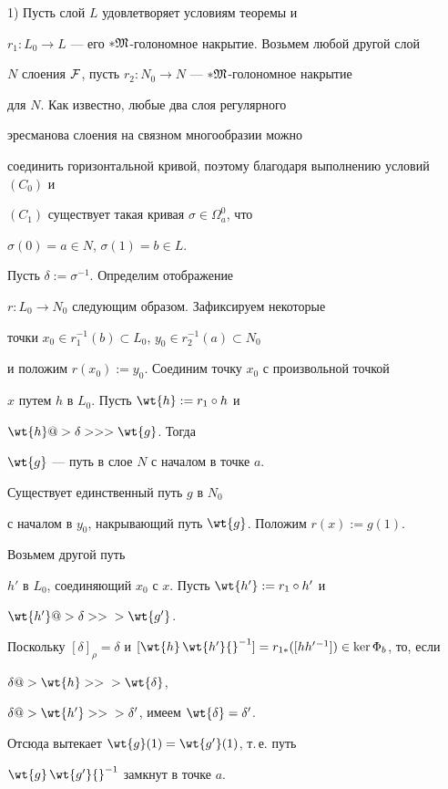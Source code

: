 \begin{pf}


1) Пусть слой $L$ удовлетворяет условиям теоремы и


$r_1: L_0\to L$ --- его $*\frak M$-голономное накрытие. Возьмем любой другой слой


$N$ слоения $\cal F$, пусть $r_2: N_0\to N$ --- $*\frak M$-голономное накрытие


для $N$. Как известно, любые два слоя регулярного


эресманова слоения на связном многообразии можно


соединить горизонтальной кривой, поэтому благодаря выполнению условий $(C_0)$ и


$(C_1)$ существует такая кривая $\sigma\in\Omega^0_a$, что


$\sigma(0)=a\in N$, $\sigma(1)=b\in L$.


Пусть $\delta:=\sigma^{-1}$. Определим отображение


$r: L_0\to N_0$ следующим образом. Зафиксируем некоторые


точки $x_0\in r_1^{-1}(b)\subset L_0$, $y_0\in r_2^{-1}(a)\subset N_0$


и положим $r(x_0):=y_0$. Соединим точку $x_0$ с произвольной точкой


$x$ путем $h$ в $L_0$. Пусть $\wt{h}:=r_1\circ h$ и


$\wt{h}@> {\delta}>> >\wt{g}$. Тогда


$\wt{g}$ --- путь в слое $N$ с началом в точке $a$.


Существует единственный путь $g$ в $N_0$


с началом в $y_0$, накрывающий путь $\wt{g}$. Положим $r(x):=g(1)$.


Возьмем другой путь


$h'$ в $L_0$, соединяющий $x_0$ с $x$. Пусть $\wt{h'}:=r_1\circ h'$ и


$\wt{h'}@> {\delta}>>{} >\wt{g'}$.


Поскольку $[\delta]_{\rho}=\delta$ и $[\wt{h}\,


\wt{h'}{}^{-1}]=r_{1*}([h h'{}^{-1}])\in\ker\Phi_b$, то, если


$\delta@> {\wt{h}}>>{} >\wt{\delta}$,


$\delta@> {\wt{h'}}>>{} >\delta'$, имеем $\wt{\delta}=\delta'$.


Отсюда вытекает $\wt{g}(1)=\wt{g'}(1)$, т.\,е. путь


$\wt{g}\,\wt{g'}{}^{-1}$ замкнут в точке $a$.



\end{pf}
